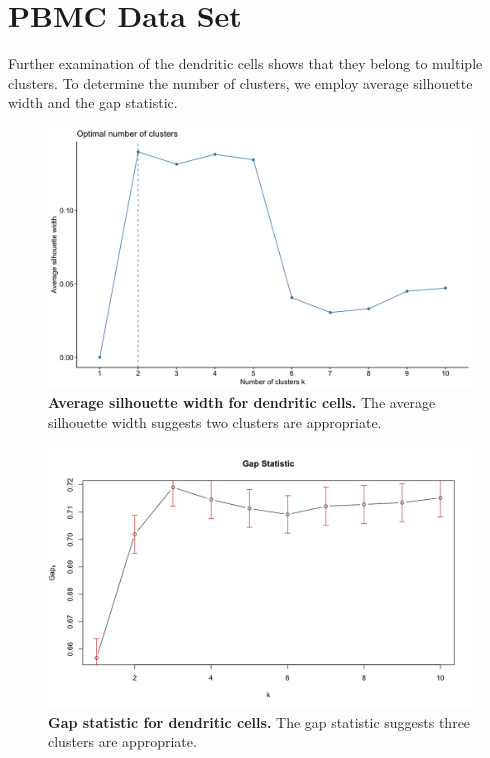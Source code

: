 \documentclass{article}
\begin{document}
\section{PBMC Data Set}
Further examination of the dendritic cells shows that they belong to multiple clusters. To determine the number of clusters, we employ average silhouette width and the gap statistic.

\begin{figure}[H]
\centering
\includegraphics[scale=0.33]{Fig S15}
\caption{{\bf Average silhouette width for dendritic cells.}
The average silhouette width suggests two clusters are appropriate.}
\end{figure}

\begin{figure}[H]
\centering
\includegraphics[scale=0.33]{Fig S16}
\caption{{\bf Gap statistic for dendritic cells.}
The gap statistic suggests three clusters are appropriate.}
\end{figure}
\end{document}
